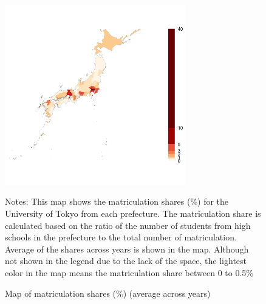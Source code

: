 \documentclass[12pt,letterpaper]{article}
\begin{document}
\begin{figure}[H]
  \centering
  \caption{Map of matriculation shares (\%) (average across years)}
  \includegraphics[width = 0.7\textwidth]{../Output/images/admission_map.png}
  \label{fig:admission_map}
  \footnotesize
  \begin{tablenotes}
    \item Notes:
      This map shows the matriculation shares (\%) for the University of Tokyo from each prefecture.
      The matriculation share is calculated based on the ratio of the number of students from high schools in the prefecture to the total number of matriculation.
      Average of the shares across years is shown in the map.
      Although not shown in the legend due to the lack of the space, the lightest color in the map means the matriculation share between 0 to 0.5\% 
  \end{tablenotes}
\end{figure}
\end{document}
